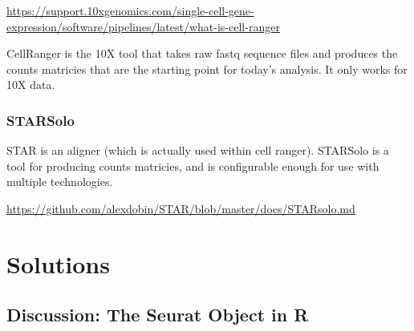\documentclass[
]{book}
\begin{document}
\url{https://support.10xgenomics.com/single-cell-gene-expression/software/pipelines/latest/what-is-cell-ranger}

CellRanger is the 10X tool that takes raw fastq sequence files and produces the counts matricies that are the starting point for today's analysis. It only works for 10X data.

\hypertarget{starsolo}{%
\subsection*{STARSolo}\label{starsolo}}

STAR is an aligner (which is actually used within cell ranger). STARSolo is a tool for producing counts matricies, and is configurable enough for use with multiple technologies.

\url{https://github.com/alexdobin/STAR/blob/master/docs/STARsolo.md}

\hypertarget{solutions}{%
\chapter{Solutions}\label{solutions}}

\hypertarget{discussion-the-seurat-object-in-r-1}{%
\section{Discussion: The Seurat Object in R}\label{discussion-the-seurat-object-in-r-1}}
\end{document}
